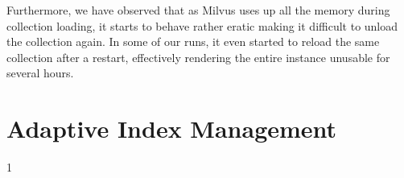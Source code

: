Furthermore, we have observed that as Milvus uses up all the memory during collection loading, it starts to behave rather eratic making it difficult to unload the collection again. In some of our runs, it even started to reload the same collection after a restart, effectively rendering the entire instance unusable for several hours.

\section{Adaptive Index Management}

1